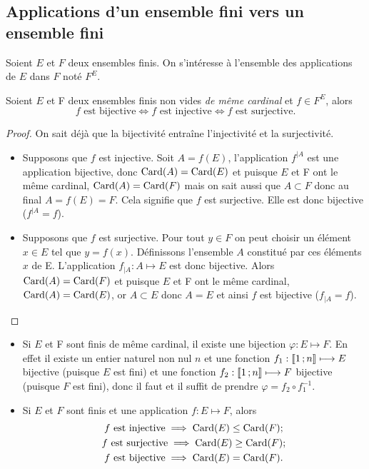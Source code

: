 \subsection{Applications d'un ensemble fini vers un ensemble fini}
Soient $E$ et $F$ deux ensembles finis. On s'intéresse à l'ensemble des applications de $E$ dans $F$ noté $F^E$.
\begin{theo}\label{theo:bijinjsurj}
  Soient $E$ et F deux ensembles finis non vides \emph{de même cardinal} et $f\in F^E$, alors
  \begin{equation}
    f \text{~est bijective}\iff f \text{~est injective}\iff f \text{~est surjective}.
  \end{equation}
\end{theo}
\begin{proof}
  On sait déjà que la bijectivité entraîne l'injectivité et la surjectivité.
  \begin{itemize}
  \item Supposons que $f$ est injective. Soit $A=f(E)$, l'application $f^{|A}$ est une application bijective, donc $\operatorname{Card}(A)=\operatorname{Card}(E)$ et puisque $E$ et F ont le même cardinal, $\operatorname{Card}(A)=\operatorname{Card}(F)$ mais on sait aussi que $A\subset F$ donc au final $A=f(E)=F$. Cela signifie que $f$ est surjective. Elle est donc bijective ($f^{|A}=f$).
  \item Supposons que $f$ est surjective. Pour tout $y\in F$ on peut choisir un élément $x\in E$ tel que $y=f(x)$. Définissons l'ensemble $A$ constitué par ces éléments $x$ de E. L'application $f_{|A}:A\longmapsto E$ est donc bijective. Alors $\operatorname{Card}(A)=\operatorname{Card}(F)$ et puisque $E$ et F ont le même cardinal, $\operatorname{Card}(A)=\operatorname{Card}(E)$, or $A\subset E$ donc $A=E$ et ainsi $f$ est bijective ($f_{|A}=f$).
  \end{itemize}
\end{proof}
\begin{itemize}
\item Si $E$ et F sont finis de même cardinal, il existe une bijection $\varphi:E\longmapsto F$. En effet il existe un entier naturel non nul $n$ et une fonction $f_1:\mathopen{\llbracket}1\mathclose{}\mathpunct{};n\mathclose{\rrbracket} \longmapsto E$ bijective (puisque $E$ est fini) et une fonction $f_2:\mathopen{\llbracket}1\mathclose{}\mathpunct{};n\mathclose{\rrbracket} \longmapsto F$ bijective (puisque $F$ est fini), donc il faut et il suffit de prendre $\varphi=f_2\circ f_1^{-1}$.
\item Si $E$ et $F$ sont finis et une application $f:E\longmapsto F$, alors
  \begin{gather}
    f \text{~est injective} \implies \operatorname{Card}(E)\leq\operatorname{Card}(F); \\
    f \text{~est surjective}\implies \operatorname{Card}(E)\geq\operatorname{Card}(F);\\
    f \text{~est bijective} \implies \operatorname{Card}(E)=\operatorname{Card}(F). 
  \end{gather}
\end{itemize}
